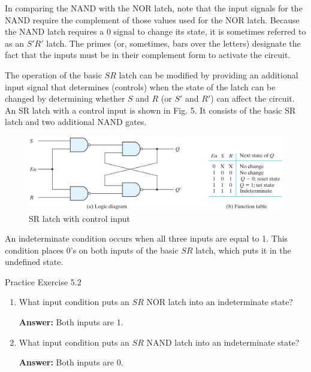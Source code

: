 In comparing the NAND with the NOR latch, note that the input signals for the NAND require the complement of those values used for the NOR latch. Because the NAND latch requires a 0 signal to change its state, it is sometimes referred to as an $S'R'$ latch. The primes (or, sometimes, bars over the letters) designate the fact that the inputs must be in their complement form to activate the circuit.

The operation of the basic $SR$ latch can be modified by providing an additional input signal that determines (controls) when the state of the latch can be changed by determining whether $S$ and $R$ (or $S'$ and $R'$) can affect the circuit. An SR latch with a control input is shown in Fig. 5. It consists of the basic SR latch and two additional NAND gates.
\begin{figure}[H]
  \centering
  \includegraphics[width=\linewidth]{img/fig-5.5.png}
  \caption{SR latch with control input}
  \label{fig:5.5}
\end{figure}
An indeterminate condition occurs when all three inputs are equal to 1. This condition places 0's on both inputs of the basic $SR$ latch, which puts it in the undefined state.

\begin{practice}{Practice Exercise 5.2}
\begin{enumerate}[label=(\alph*), leftmargin=0.5cm]
  \item What input condition puts an $SR$ NOR latch into an indeterminate state?
  
  \textbf{Answer:} Both inputs are 1.
  
  \item What input condition puts an $SR$ NAND latch into an indeterminate state?
  
  \textbf{Answer:} Both inputs are 0.
\end{enumerate}
\end{practice}
